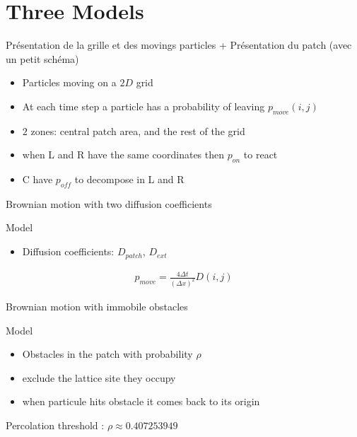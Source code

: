 \documentclass{beamer}
\begin{document}
\section{Three Models}

\begin{frame}
Présentation de la grille et des movings particles
+ 
Présentation du patch (avec un petit schéma)
\begin{block}{}
\begin{itemize}
\itemsep1em
\item Particles moving on a $2D$ grid
\item At each time step a particle has a probability of leaving $p_{move}(i,j)$
\item $2$ zones: central patch area, and the rest of the grid
\item when L and R have the same coordinates then $p_{on}$ to react
\item C have $p_{off}$ to decompose in L and R
\end{itemize}
\end{block}

\end{frame}

\begin{frame}{Brownian motion with two diffusion coefficients}
\begin{block}{Model}
\begin{itemize}
\itemsep1em
\item Diffusion coefficients: $D_{patch}$, $D_{ext}$
\end{itemize}
\end{block}

\begin{align*}
p_{move} = \frac{4 \Delta t}{(\Delta x)^2} D(i,j)
\end{align*}

\end{frame}

\begin{frame}{Brownian motion with immobile obstacles}
\begin{block}{Model}
\begin{itemize}
\itemsep1em
\item Obstacles in the patch with probability $\rho$
\item exclude the lattice site they occupy
\item when particule hits obstacle it comes back to its origin
\end{itemize}
\end{block}


Percolation threshold : $\rho \approx 0.407253949$


\end{frame}
\end{document}
